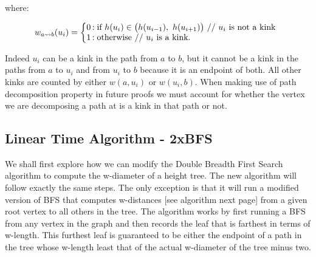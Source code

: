    where:
    
   $$
   w_{a \rightsquigarrow b}(u_i) = \left\{
       \begin{array}{@{}l@{\thinspace}l}
           \text{0}  &: \text{if } h(u_i) \in \big(h(u_{i-1}),~h(u_{i+1}) \big) \text{ // $u_i$ is not a kink} \\
           \text{1} &: \text{otherwise // $u_i$ is a kink.} \\
       \end{array}
   \right.
   $$

   Indeed $u_i$ can be a kink in the path from $a$ to $b$, but it cannot be a kink in the paths from $a$ to $u_i$ and from $u_i$ to $b$ because it is an endpoint of both. All other kinks are counted by either $w(a, u_i)$ or $w(u_i, b)$. When making use of path decomposition property in future proofs we must account for whether the vertex we are decomposing a path at is a kink in that path or not.


\subsection{Linear Time Algorithm - 2xBFS}

We shall first explore how we can modify the Double Breadth First Search algorithm to compute the w-diameter of a height tree. The new algorithm will follow exactly the same steps. The only exception is that it will run a modified version of BFS that computes w-distances [see algorithm next page] from a given root vertex to all others in the tree. The algorithm works by first running a BFS from any vertex in the graph and then records the leaf that is farthest in terms of w-length. This furthest leaf is guaranteed to be either the endpoint of a path in the tree whose w-length least that of the actual w-diameter of the tree minus two. 


